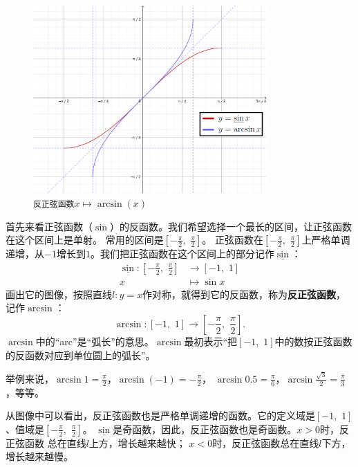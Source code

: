 \documentclass[12pt,UTF8]{ctexbook}
\begin{document}
\begin{figure}[h] %
    \vspace{4pt}
    \centering
    \includegraphics[width=0.8\textwidth]{tu/反正弦函数1.png}
    \caption*{\texttt{反正弦函数}$x\mapsto \arcsin(x)$}
\end{figure}

首先来看正弦函数（$\sin$）的反函数。我们希望选择一个最长的区间，让正弦函数在这个区间上是单射。
常用的区间是$[-\frac{\pi}{2}, \,\, \frac{\pi}{2}]$。
正弦函数在$[-\frac{\pi}{2}, \,\, \frac{\pi}{2}]$上严格单调递增，从$-1$增长到$1$。我们把正弦函数在这个区间上的部分记作$\underline{\sin}$：
\begin{align*}
     \underline{\sin} : [-\frac{\pi}{2}, \,\, \frac{\pi}{2}] &\rightarrow [-1,\,\, 1] \\
                                                           x &\mapsto \sin{x} 
\end{align*}
画出它的图像，按照直线$l: y = x$作对称，就得到它的反函数，称为\textbf{反正弦函数}，记作$\arcsin$：
$$ \arcsin : [-1,\,\, 1] \rightarrow [-\frac{\pi}{2}, \,\, \frac{\pi}{2}] . $$
$\arcsin$中的“arc”是“弧长”的意思。$\arcsin$最初表示“把$[-1,\,\, 1]$中的数按正弦函数的反函数对应到单位圆上的弧长”。

举例来说，$\arcsin{1} = \frac{\pi}{2}$，$\arcsin{(-1)} = -\frac{\pi}{2}$，
$\arcsin{0.5} = \frac{\pi}{6}$，$\arcsin{\frac{\sqrt{3}}{2}} = \frac{\pi}{3}$，等等。

从图像中可以看出，反正弦函数也是严格单调递增的函数。它的定义域是$[-1,\,\, 1]$、值域是$[-\frac{\pi}{2}, \,\, \frac{\pi}{2}]$。
$\underline{\sin}$是奇函数，因此，反正弦函数也是奇函数。$x > 0$时，反正弦函数
总在直线$l$上方，增长越来越快；
$x < 0$时，反正弦函数总在直线$l$下方，增长越来越慢。
\end{document}
